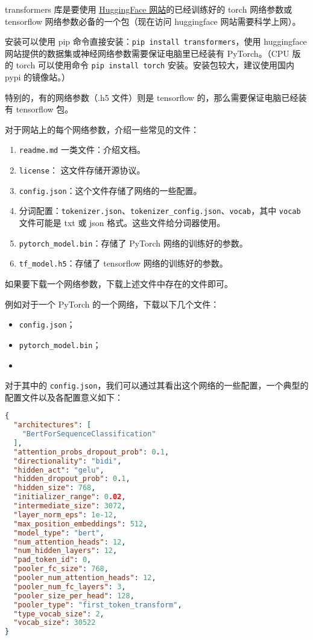 
\begin{issues}
\issueDraft
\end{issues}

transformers 库是要使用 \href{https://huggingface.co}{HuggingFace 网站}的已经训练好的 torch 网络参数或 tensorflow 网络参数必备的一个包（现在访问 huggingface 网站需要科学上网）。

安装可以使用 pip 命令直接安装：\verb`pip install transformers`，使用 huggingface 网站提供的数据集或神经网络参数需要保证电脑里已经装有 PyTorch。（CPU 版的 torch 可以使用命令 \verb`pip install torch` 安装。安装包较大，建议使用国内 pypi 的镜像站。）

特别的，有的网络参数（.h5 文件）则是 tensorflow 的，那么需要保证电脑已经装有 tensorflow 包。

对于网站上的每个网络参数，介绍一些常见的文件：
\begin{enumerate}
\item \verb`readme.md` 一类文件：介绍文档。
\item \verb`license`： 这文件存储开源协议。
\item \verb`config.json`：这个文件存储了网络的一些配置。
\item 分词配置：\verb`tokenizer.json`、\verb`tokenizer_config.json`、\verb`vocab`，其中 \verb`vocab` 文件可能是 txt 或 json 格式。这些文件给分词器使用。
\item \verb`pytorch_model.bin`：存储了 PyTorch 网络的训练好的参数。
\item \verb`tf_model.h5`：存储了 tensorflow 网络的训练好的参数。
\end{enumerate}

如果要下载一个网络参数，下载上述文件中存在的文件即可。

例如对于一个 PyTorch 的一个网络，下载以下几个文件：
\begin{itemize}
\item \verb`config.json`；
\item \verb`pytorch_model.bin`；
\item \verb``
\end{itemize}

对于其中的 \verb`config.json`，我们可以通过其看出这个网络的一些配置，一个典型的配置文件以及各配置意义如下：
\begin{lstlisting}[language=json]
{
  "architectures": [
    "BertForSequenceClassification"
  ],
  "attention_probs_dropout_prob": 0.1,
  "directionality": "bidi",
  "hidden_act": "gelu",
  "hidden_dropout_prob": 0.1,
  "hidden_size": 768,
  "initializer_range": 0.02,
  "intermediate_size": 3072,
  "layer_norm_eps": 1e-12,
  "max_position_embeddings": 512,
  "model_type": "bert",
  "num_attention_heads": 12,
  "num_hidden_layers": 12,
  "pad_token_id": 0,
  "pooler_fc_size": 768,
  "pooler_num_attention_heads": 12,
  "pooler_num_fc_layers": 3,
  "pooler_size_per_head": 128,
  "pooler_type": "first_token_transform",
  "type_vocab_size": 2,
  "vocab_size": 30522
}
\end{lstlisting}

